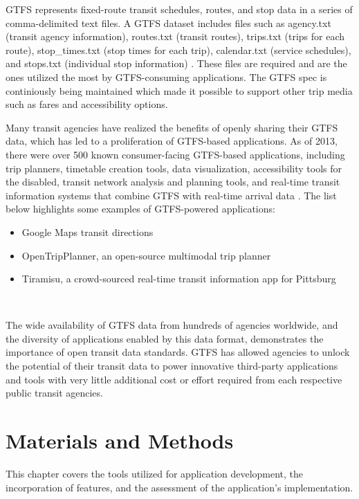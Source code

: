 \documentclass[journal]{./IEEE/IEEEtran}
\begin{document}
GTFS represents fixed-route transit schedules, routes, and stop data in a series of comma-delimited text files.
A GTFS dataset includes files such as agency.txt (transit agency information), routes.txt (transit routes), trips.txt (trips for each route), stop\_times.txt (stop times for each trip), calendar.txt (service schedules), and stops.txt (individual stop information) \cite{Antrim01}.
These files are required and are the ones utilized the most by GTFS-consuming applications. The GTFS spec is continiously being maintained which made it possible to support other trip media such as fares and accessibility options.

Many transit agencies have realized the benefits of openly sharing their GTFS data, which has led to a proliferation of GTFS-based applications.
As of 2013, there were over 500 known consumer-facing GTFS-based applications, including trip planners, timetable creation tools, data visualization, accessibility tools for the disabled, transit network analysis and planning tools, and real-time transit information systems that combine GTFS with real-time arrival data \cite{Antrim01}.
The list below highlights some examples of GTFS-powered applications:

\begin{itemize}
    \item Google Maps transit directions
    \item OpenTripPlanner, an open-source multimodal trip planner
    \item Tiramisu, a crowd-sourced real-time transit information app for Pittsburg
\end{itemize} \hfill \

The wide availability of GTFS data from hundreds of agencies worldwide, and the diversity of applications enabled by this data format, demonstrates the importance of open transit data standards.
GTFS has allowed agencies to unlock the potential of their transit data to power innovative third-party applications and tools with very little additional cost or effort required from each respective public transit agencies. 

\section{Materials and Methods}
This chapter covers the tools utilized for application development, the incorporation of features, and the assessment of the application's implementation.
\end{document}
